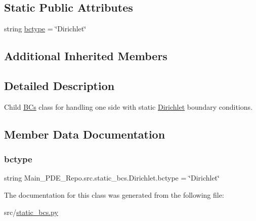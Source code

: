 \subsection*{Static Public Attributes}
\begin{DoxyCompactItemize}
\item 
string \hyperlink{classMain__PDE__Repo_1_1src_1_1static__bcs_1_1Dirichlet_a20fe8b472cfabd83d02026d43a9769cf}{bctype} = \char`\"{}Dirichlet\char`\"{}
\end{DoxyCompactItemize}
\subsection*{Additional Inherited Members}


\subsection{Detailed Description}
Child \hyperlink{namespaceMain__PDE__Repo_1_1src_1_1BCs}{B\+Cs} class for handling one side with static \hyperlink{classMain__PDE__Repo_1_1src_1_1static__bcs_1_1Dirichlet}{Dirichlet} boundary conditions. 



\subsection{Member Data Documentation}
\mbox{\label{classMain__PDE__Repo_1_1src_1_1static__bcs_1_1Dirichlet_a20fe8b472cfabd83d02026d43a9769cf}} 
\subsubsection{\texorpdfstring{bctype}{bctype}}
{\footnotesize\ttfamily string Main\+\_\+\+P\+D\+E\+\_\+\+Repo.\+src.\+static\+\_\+bcs.\+Dirichlet.\+bctype = \char`\"{}Dirichlet\char`\"{}\hspace{0.3cm}{\ttfamily [static]}}



The documentation for this class was generated from the following file\+:\begin{DoxyCompactItemize}
\item 
src/\hyperlink{static__bcs_8py}{static\+\_\+bcs.\+py}\end{DoxyCompactItemize}
